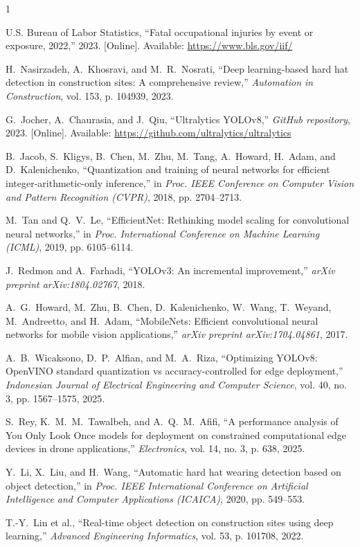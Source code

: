 \documentclass[conference,a4paper]{IEEEtran}
\begin{document}
\begin{thebibliography}{1}

U.S. Bureau of Labor Statistics, ``Fatal occupational injuries by event or exposure, 2022,'' 2023. [Online]. Available: \url{https://www.bls.gov/iif/}

H.~Nasirzadeh, A.~Khosravi, and M.~R.~Nosrati, ``Deep learning-based hard hat detection in construction sites: A comprehensive review,'' \emph{Automation in Construction}, vol. 153, p. 104939, 2023.

G.~Jocher, A.~Chaurasia, and J.~Qiu, ``Ultralytics YOLOv8,'' \emph{GitHub repository}, 2023. [Online]. Available: \url{https://github.com/ultralytics/ultralytics}

B.~Jacob, S.~Kligys, B.~Chen, M.~Zhu, M.~Tang, A.~Howard, H.~Adam, and D.~Kalenichenko, ``Quantization and training of neural networks for efficient integer-arithmetic-only inference,'' in \emph{Proc. IEEE Conference on Computer Vision and Pattern Recognition (CVPR)}, 2018, pp. 2704--2713.

M.~Tan and Q.~V.~Le, ``EfficientNet: Rethinking model scaling for convolutional neural networks,'' in \emph{Proc. International Conference on Machine Learning (ICML)}, 2019, pp. 6105--6114.

J.~Redmon and A.~Farhadi, ``YOLOv3: An incremental improvement,'' \emph{arXiv preprint arXiv:1804.02767}, 2018.

A.~G.~Howard, M.~Zhu, B.~Chen, D.~Kalenichenko, W.~Wang, T.~Weyand, M.~Andreetto, and H.~Adam, ``MobileNets: Efficient convolutional neural networks for mobile vision applications,'' \emph{arXiv preprint arXiv:1704.04861}, 2017.

A.~B.~Wicaksono, D.~P.~Alfian, and M.~A.~Riza, ``Optimizing YOLOv8: OpenVINO standard quantization vs accuracy-controlled for edge deployment,'' \emph{Indonesian Journal of Electrical Engineering and Computer Science}, vol. 40, no. 3, pp. 1567--1575, 2025.

S.~Rey, K.~M.~M.~Tawalbeh, and A.~Q.~M.~Afifi, ``A performance analysis of You Only Look Once models for deployment on constrained computational edge devices in drone applications,'' \emph{Electronics}, vol. 14, no. 3, p. 638, 2025.

Y.~Li, X.~Liu, and H.~Wang, ``Automatic hard hat wearing detection based on object detection,'' in \emph{Proc. IEEE International Conference on Artificial Intelligence and Computer Applications (ICAICA)}, 2020, pp. 549--553.

T.-Y.~Lin et al., ``Real-time object detection on construction sites using deep learning,'' \emph{Advanced Engineering Informatics}, vol. 53, p. 101708, 2022.

\end{thebibliography}
\end{document}
